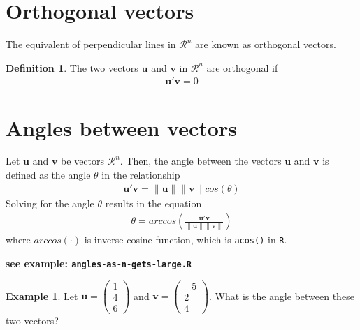 \documentclass[
]{book}
\theoremstyle{definition}
\newtheorem{definition}{Definition}[chapter]
\theoremstyle{definition}
\newtheorem{example}{Example}[chapter]
\theoremstyle{definition}
\theoremstyle{definition}
\theoremstyle{remark}
\begin{document}
\hypertarget{orthogonal-vectors}{%
\section{Orthogonal vectors}\label{orthogonal-vectors}}

The equivalent of perpendicular lines in \(\mathcal{R}^n\) are known as orthogonal vectors.

\begin{definition}
The two vectors \(\mathbf{u}\) and \(\mathbf{v}\) in \(\mathcal{R}^n\) are orthogonal if
\[
\begin{aligned}
\mathbf{u}' \mathbf{v} = 0
\end{aligned}
\]
\end{definition}

\hypertarget{angles-between-vectors}{%
\section{Angles between vectors}\label{angles-between-vectors}}

Let \(\mathbf{u}\) and \(\mathbf{v}\) be vectors \(\mathcal{R}^n\). Then, the angle between the vectors \(\mathbf{u}\) and \(\mathbf{v}\) is defined as the angle \(\theta\) in the relationship
\[
\begin{aligned}
\mathbf{u}' \mathbf{v} = \| \mathbf{u} \| \| \mathbf{v} \| cos(\theta)
\end{aligned}
\]
Solving for the angle \(\theta\) results in the equation
\[
\begin{aligned}
\theta = arccos \left( \frac{\mathbf{u}' \mathbf{v}}{\| \mathbf{u} \| \| \mathbf{v} \|} \right)
\end{aligned}
\]
where \(arccos(\cdot)\) is inverse cosine function, which is \texttt{acos()} in \texttt{R}.

\textbf{see example: \texttt{angles-as-n-gets-large.R}}

\begin{example}
Let \(\mathbf{u} = \begin{pmatrix} 1 \\ 4 \\ 6 \end{pmatrix}\) and \(\mathbf{v} = \begin{pmatrix} -5 \\ 2 \\ 4 \end{pmatrix}\). What is the angle between these two vectors?
\end{example}
\end{document}
